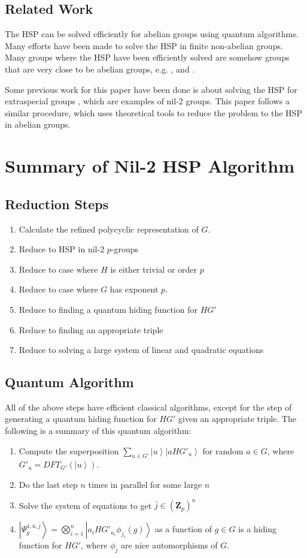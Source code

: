 \documentclass[conference]{IEEEtran}
\newcommand{\ket}[1]{\left| #1 \right\rangle}
\begin{document}
\subsection{Related Work}
The HSP can be solved efficiently for abelian groups using quantum algorithms. Many efforts have been made to solve the HSP in finite non-abelian groups. Many groups where the HSP have been efficiently solved are somehow groups that are very close to be abelian groups, e.g. \cite{Grigni}, \cite{Beth} and \cite{Moore}.

Some previous work for this paper have been done is about solving the HSP for extraspecial groups \cite{Ivanyos}, which are examples of nil-2 groups. This paper follows a similar procedure, which uses theoretical tools to reduce the problem to the HSP in abelian groups.

\section{Summary of Nil-2 HSP Algorithm}


\subsection{Reduction Steps}

\begin{enumerate}
\item Calculate the refined polycyclic representation of $G$.
\item Reduce to HSP in nil-2 $p$-groups
\item Reduce to case where $H$ is either trivial or order $p$
\item Reduce to case where $G$ has exponent $p$.
\item Reduce to finding a quantum hiding function for  $HG'$
\item Reduce to finding an appropriate triple
\item Reduce to solving a large system of linear and quadratic equations
\end{enumerate}

\subsection{Quantum Algorithm}

All of the above steps have efficient classical algorithms, except for the step of generating a quantum hiding function for $HG'$ given an appropriate triple.  The following is a summary of this quantum algorithm:
\begin{enumerate}
\item Compute the superposition $\sum_{u \in G'} \ket{u} \ket{aHG'_u}$ for random $a \in G$, where $G'_u = DFT_{G'}(\ket{u})$.
\item Do the last step $n$ times in parallel for some large $n$
\item Solve the system of equations to get $\bar j \in (\mathbf{Z}_p)^n$
\item $\ket{\Psi_g^{\bar a, \bar u, \bar j}} = \bigotimes_{i=1}^n \ket {a_i H G'_{u_i} \phi_{j_i}(g)}$ as a function of $g \in G$ is a hiding function for $H G'$, where $\phi_j$ are nice automorphisms of $G$.
\end{enumerate}
\end{document}
